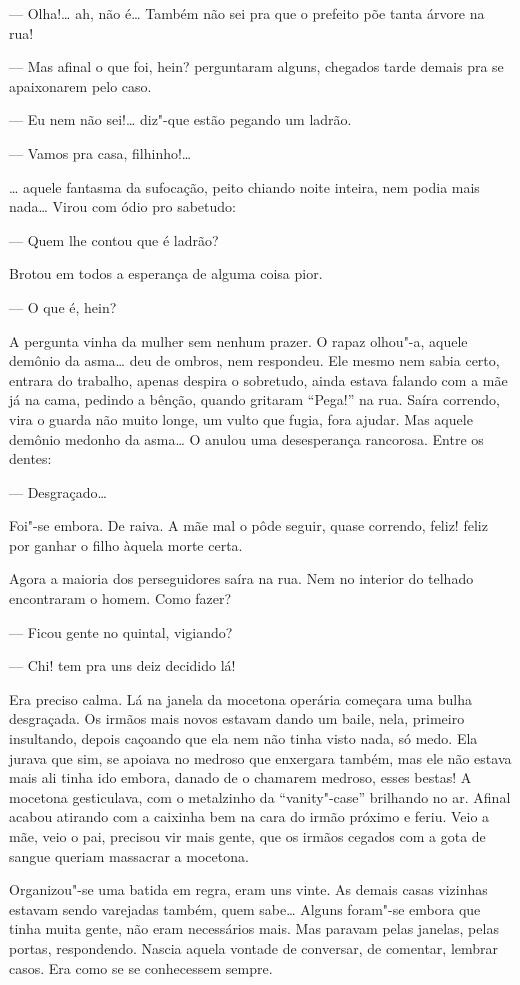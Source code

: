 --- Olha!\ldots{} ah, não é\ldots{} Também não sei pra que o prefeito põe tanta
árvore na rua!

--- Mas afinal o que foi, hein? perguntaram alguns, chegados tarde
demais pra se apaixonarem pelo caso.

--- Eu nem não sei!\ldots{} diz"-que estão pegando um ladrão.

--- Vamos pra casa, filhinho!\ldots{}

\ldots{} aquele fantasma da sufocação, peito chiando noite inteira, nem podia
mais nada\ldots{} Virou com ódio pro sabetudo:

--- Quem lhe contou que é ladrão?

Brotou em todos a esperança de alguma coisa pior.

--- O que é, hein?

A pergunta vinha da mulher sem nenhum prazer. O rapaz olhou"-a, aquele
demônio da asma\ldots{} deu de ombros, nem respondeu. Ele mesmo nem sabia
certo, entrara do trabalho, apenas despira o sobretudo, ainda estava
falando com a mãe já na cama, pedindo a bênção, quando gritaram
``Pega!'' na rua. Saíra correndo, vira o guarda não muito longe, um
vulto que fugia, fora ajudar. Mas aquele demônio medonho da asma\ldots{} O
anulou uma desesperança rancorosa. Entre os dentes:

--- Desgraçado\ldots{}

Foi"-se embora. De raiva. A mãe mal o pôde seguir, quase correndo, feliz!
feliz por ganhar o filho àquela morte certa.

Agora a maioria dos perseguidores saíra na rua. Nem no interior do
telhado encontraram o homem. Como fazer?

--- Ficou gente no quintal, vigiando?

--- Chi! tem pra uns deiz decidido lá!

Era preciso calma. Lá na janela da mocetona operária começara uma bulha
desgraçada. Os irmãos mais novos estavam dando um baile, nela, primeiro
insultando, depois caçoando que ela nem não tinha visto nada, só medo.
Ela jurava que sim, se apoiava no medroso que enxergara também, mas ele
não estava mais ali tinha ido embora, danado de o chamarem medroso,
esses bestas! A mocetona gesticulava, com o metalzinho da
``vanity"-case'' brilhando no ar. Afinal acabou atirando com a caixinha
bem na cara do irmão próximo e feriu. Veio a mãe, veio o pai, precisou
vir mais gente, que os irmãos cegados com a gota de sangue queriam
massacrar a mocetona.

Organizou"-se uma batida em regra, eram uns vinte. As demais casas
vizinhas estavam sendo varejadas também, quem sabe\ldots{} Alguns foram"-se
embora que tinha muita gente, não eram necessários mais. Mas paravam
pelas janelas, pelas portas, respondendo. Nascia aquela vontade de
conversar, de comentar, lembrar casos. Era como se se conhecessem
sempre.

